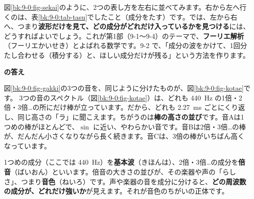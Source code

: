 図\ref{bk:9-0:fig-sekai}のように、2つの表し方を左右に並べてみます。右から左へ行くのは、表\ref{bk:9-0:tab-tasu}でしたこと（成分をたす）です。では、左から右へ、つまり\textbf{波形だけを見て、どの成分がどれだけ入っているかを見つける}には、どうすればよいでしょう。これが第1部（9-1〜9-4）のテーマで、\textbf{フーリエ解析}（フーリエかいせき）とよばれる数学です。9-2 で、「成分の波をかけて、1回分たし合わせる（積分する）と、ほしい成分だけが残る」という方法を作ります。

\begin{bkfigure}
\label{bk:9-0:fig-sekai}
\end{bkfigure}

\noindent\textbf{\bkhatenaref の答え}\par
図\ref{bk:9-0:fig-gakki}の3つの音を、同じように分けたものが、図\ref{bk:9-0:fig-kotae}です。
3つの音のスペクトル（図\ref{bk:9-0:fig-kotae}）は、どれも \qty{440}{Hz} の1倍・2倍・3倍…の所にだけ棒が立っています。だから、どれも \qty{2.27}{ms} ごとにくり返し、同じ高さの「ラ」に聞こえます。ちがうのは\textbf{棒の高さの並び}です。音Aは1つめの棒がほとんどで、$\sin$ に近い、やわらかい音です。音Bは2倍・3倍…の棒が、だんだん小さくなりながら長く続きます。音Cは、3倍の棒がいちばん高くなっています。

1つめの成分（ここでは \qty{440}{Hz}）を\textbf{基本波}（きほんは）、2倍・3倍…の成分を\textbf{倍音}（ばいおん）といいます。倍音の大きさの並びが、その楽器や声の「らしさ」、つまり\textbf{音色}（ねいろ）です。声や楽器の音を成分に分けると、\textbf{どの周波数の成分が、どれだけ強いか}が見えます。それが音色のちがいの正体です。


